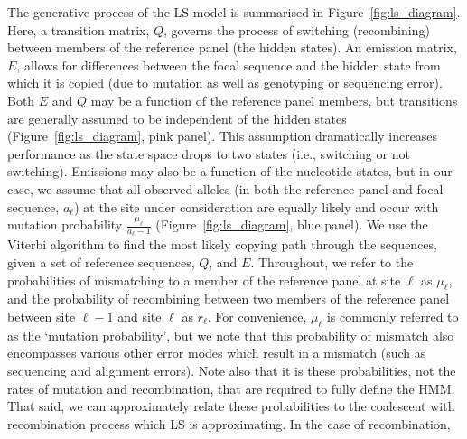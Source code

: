 \documentclass{article}
\begin{document}
%
%

The generative process of the LS model is summarised in
Figure~\ref{fig:ls_diagram}. Here, a transition matrix, $Q$, governs the
process of switching (recombining) between members of the reference panel (the
hidden states). An emission matrix, $E$, allows for differences between the
focal sequence and the hidden state from which it is copied (due to mutation as
well as genotyping or sequencing error). Both $E$ and $Q$ may be a function of the reference panel members,
but transitions are generally assumed to be independent of the hidden states (Figure~\ref{fig:ls_diagram}, pink panel).
This assumption dramatically increases performance as the state space drops to two states (i.e., switching or not switching).
Emissions may also be a function of the nucleotide states, but in our
case, we assume that all observed alleles (in both the reference panel and
focal sequence, $a_\ell$) at the site under consideration are equally likely and
occur with mutation probability $\frac{\mu_\ell}{a_\ell-1}$ (Figure~\ref{fig:ls_diagram}, blue panel).
We use the Viterbi algorithm
\citep{Viterbi1967-ol} to find the most likely copying path through the
sequences, given a set of reference sequences, $Q$, and $E$. Throughout, we refer to the probabilities of mismatching to a member of the reference panel at site $\ell$ as $\mu_\ell$,
and the probability of recombining between two members of the reference panel between site $\ell-1$ and site $\ell$ as $r_\ell$. For convenience, $\mu_\ell$ is commonly referred to as the `mutation probability', but we note that this probability of
mismatch also encompasses various other error modes which result in a mismatch
(such as sequencing and alignment errors). Note also that it is these probabilities,
not the rates of mutation and recombination, that are required to fully define the HMM.
That said, we can approximately relate these probabilities to the coalescent with recombination process which LS is approximating. In the case of recombination,
\end{document}
